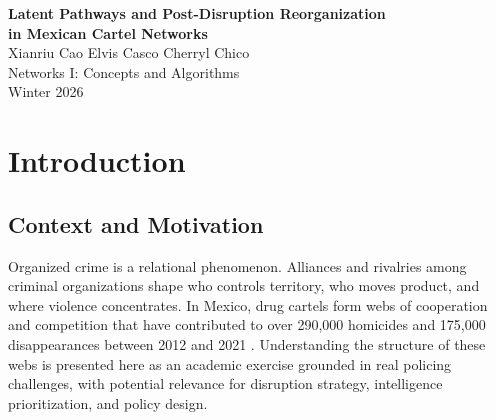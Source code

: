 \documentclass[11pt, a4paper]{article}
\begin{document}
\begin{center}
    {\LARGE \bfseries Latent Pathways and Post-Disruption Reorganization\\[4pt]
    in Mexican Cartel Networks}\\[18pt]

    Xianriu Cao \quad Elvis Casco \quad Cherryl Chico\\[12pt]

    {\large Networks I: Concepts and Algorithms}\\[4pt]
    {\large Winter 2026}\\[12pt]

\end{center}

\vspace{1em}

\begin{abstract}
\noindent
This paper analyzes the BACRIM 2020 signed network of 150 Mexican criminal organizations using centrality analysis, null-model comparison, link prediction, and targeted node-removal simulation. The alliance network is sparse, clustered above random baselines, and dominated by two hubs (CJNG and Sinaloa). A dyadic logistic model incorporating geography, shared rivalries, and specialty outperforms topology-only link prediction (AUC 0.73 vs.\ chance). Targeted removal of CJNG fragments the network into multiple disconnected components, consistent with theoretical predictions for heavy-tailed topologies. Events between 2024 and 2026, including the arrest of El Mayo Zambada, the killing of El Mencho, and mass extraditions, track the structural vulnerabilities flagged by this static 2020 snapshot.
\end{abstract}

\newpage

\section{Introduction}\label{sec:intro}

\subsection{Context and Motivation}

Organized crime is a relational phenomenon. Alliances and rivalries among criminal organizations shape who controls territory, who moves product, and where violence concentrates. In Mexico, drug cartels form webs of cooperation and competition that have contributed to over 290,000 homicides and 175,000 disappearances between 2012 and 2021 \citep{inegi2022}. Understanding the structure of these webs is presented here as an academic exercise grounded in real policing challenges, with potential relevance for disruption strategy, intelligence prioritization, and policy design.
\end{document}

